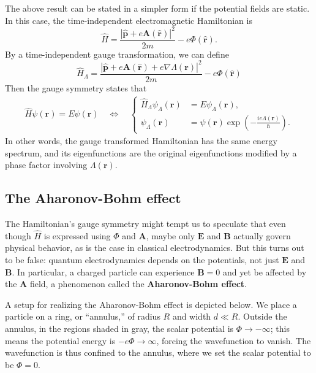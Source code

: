 \documentclass[prx,12pt]{revtex4-2}
\begin{document}
The above result can be stated in a simpler form if the potential
fields are static.  In this case, the time-independent electromagnetic
Hamiltonian is
\begin{equation}
  \hat{H} = \frac{|\hat{\mathbf{p}}+e\mathbf{A}(\hat{\mathbf{r}})|^2}{2m}
  - e\Phi(\hat{\mathbf{r}}).
  \label{timeindep}
\end{equation}
By a time-independent gauge transformation, we can define
\begin{equation}
  \hat{H}_\Lambda = \frac{|\hat{\mathbf{p}}+e\mathbf{A}(\hat{\mathbf{r}}) + e\nabla\Lambda(\mathbf{r})|^2}{2m}
  - e\Phi(\hat{\mathbf{r}})
\end{equation}
Then the gauge symmetry states that
\begin{align}
  \hat{H}\psi(\mathbf{r}) = E \psi(\mathbf{r})
  \quad \Leftrightarrow \quad
  \left\{
  \begin{aligned}
  \hat{H}_\Lambda \psi_\Lambda(\mathbf{r}) &= E \psi_\Lambda(\mathbf{r}), \\
  \psi_\Lambda(\mathbf{r}) &= \psi(\mathbf{r}) \exp\left(-\frac{ie\Lambda(\mathbf{r})}{\hbar}\right).
  \end{aligned}\right.
\end{align}
In other words, the gauge transformed Hamiltonian has the same energy
spectrum, and its eigenfunctions are the original eigenfunctions
modified by a phase factor involving $\Lambda(\mathbf{r})$.

\subsection{The Aharonov-Bohm effect}

The Hamiltonian's gauge symmetry might tempt us to speculate that even
though $\hat{H}$ is expressed using $\Phi$ and $\mathbf{A}$, maybe
only $\mathbf{E}$ and $\mathbf{B}$ actually govern physical behavior,
as is the case in classical electrodynamics.  But this turns out to be
false: quantum electrodynamics depends on the potentials, not just
$\mathbf{E}$ and $\mathbf{B}$.  In particular, a charged particle can
experience $\mathbf{B} = 0$ and yet be affected by the $\mathbf{A}$
field, a phenomenon called the \textbf{Aharonov-Bohm effect}.

A setup for realizing the Aharonov-Bohm effect is depicted below.  We
place a particle on a ring, or ``annulus,'' of radius $R$ and width $d
\ll R$.  Outside the annulus, in the regions shaded in gray, the
scalar potential is $\Phi\rightarrow -\infty$; this means the
potential energy is $-e\Phi \rightarrow \infty$, forcing the
wavefunction to vanish.  The wavefunction is thus confined to the
annulus, where we set the scalar potential to be $\Phi = 0$.
\end{document}
